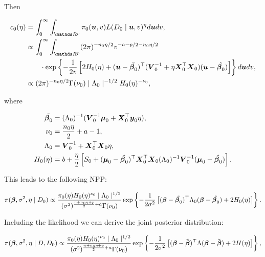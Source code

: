     Then

    \begin{align*}
        c_0(\eta) &= \int_0^\infty \int_{\bR^p} \pi_0(\bfu, v) L(D_0 \mid \bfu, v)^\eta d\bfu dv,
        \\
        &\propto \int_0^\infty \int_{\bR^p} (2\pi)^{-n_0 \eta/2} v^{-a - p/2 - n_0\eta/2}\\ & \qquad \cdot \exp\left\{ -\frac{1}{2v}\left[2H_0(\eta) + (\bfu - \tilde{\bfbt_0})^\top (\bfV_0^{-1} + \eta\bfX_0^\top \bfX_0) (\bfu - \tilde{\bfbt_0})\right] \right\} d\bfu dv,
        \\
        &\propto (2\pi)^{-n_0 \eta/2} \Gamma(\nu_0) \mid \Lambda_0 \mid^{-1/2} H_0(\eta)^{-\nu_0},
    \end{align*}

    where

    \begin{align*}
        \tilde{\boldsymbol{\beta}_0} &= (\Lambda_0)^{-1}(\boldsymbol{V}_0^{-1}\boldsymbol{\mu}_0 + \boldsymbol{X}_0^\top \boldsymbol{y}_0 \eta), 
        \\ 
        \nu_0 &= \frac{n_0\eta}{2} + a -1, 
        \\
        \Lambda_0 &= \boldsymbol{V}_0^{-1} + \boldsymbol{X}_0^\top \boldsymbol{X}_0 \eta,
        \\
        H_0(\eta) &= b + \frac{\eta}{2}\left[S_0 + (\boldsymbol{\mu}_0 - \hat{\boldsymbol{\beta}_0})^\top \boldsymbol{X}_0^\top \boldsymbol{X}_0 (\Lambda_0)^{-1} \boldsymbol{V}_0^{-1} (\boldsymbol{\mu}_0 - \hat{\boldsymbol{\beta}_0})\right]. 
    \end{align*}

    This leads to the following NPP:

    \begin{align*}
        \pi(\boldsymbol{\beta}, \sigma^2, \eta \mid D_0) \propto \frac{ \pi_0(\eta) H_0(\eta)^{\nu_0} \mid \Lambda_0 \mid^{1/2} }{ (\sigma^2)^{\frac{n + n_0\eta + p}{2} + a} \Gamma(\nu_0) } \exp \left\{ -\frac{1}{2\sigma^2} \left[ (\boldsymbol{\beta} - \tilde{\boldsymbol{\beta}_0})^\top \Lambda_0 (\boldsymbol{\beta} - \tilde{\boldsymbol{\beta}_0}) + 2H_0(\eta) \right] \right\}.
    \end{align*}

    Including the likelihood we can derive the joint posterior distribution:

    \begin{align*}
        \pi(\boldsymbol{\beta}, \sigma^2, \eta \mid D, D_0) \propto \frac{ \pi_0(\eta) H_0(\eta)^{\nu_0} \mid \Lambda_0 \mid^{1/2} }{ (\sigma^2)^{\frac{n + n_0\eta + p}{2} + a} \Gamma(\nu_0) } \exp\left\{ -\frac{1}{2\sigma^2} \left[ (\boldsymbol{\beta} - \tilde{\boldsymbol{\beta}})^\top \Lambda (\boldsymbol{\beta} - \tilde{\boldsymbol{\beta}}) + 2H(\eta) \right] \right\},
    \end{align*}

